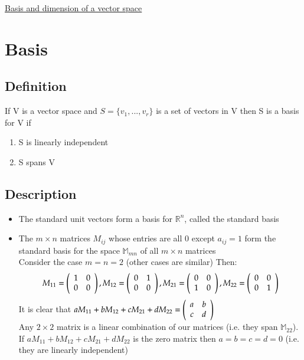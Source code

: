 \documentclass{article}[18pt]
\begin{document}
\begin{center}
\underline{\huge Basis and dimension of a vector space}
\end{center}
\section{Basis}
\subsection{Definition}
If V is a vector space and $S=\{v_1,...,v_r\}$ is a set of vectors in V then S is a basis for V if
\begin{enumerate}
	\item S is linearly independent
	\item S spans V
\end{enumerate}
\subsection{Description}
\begin{itemize}
	\item The standard unit vectors form a basis for $\mathbb{R}^n$, called the standard basis
	\item The $m\times n$ matrices $M_{ij}$ whose entries are all 0 except $a_{ij}=1$ form the standard basis for the space $\mathbb{M}_{mn}$ of all $m\times n$ matrices\\
	Consider the case $m=n=2$ (other cases are similar) Then:
	$$M _ { 11 } = \left( \begin{array} { c c } { 1 } & { 0 } \\ { 0 } & { 0 } \end{array} \right) , M _ { 12 } = \left( \begin{array} { c c } { 0 } & { 1 } \\ { 0 } & { 0 } \end{array} \right) , M _ { 21 } = \left( \begin{array} { c c } { 0 } & { 0 } \\ { 1 } & { 0 } \end{array} \right) , M _ { 22 } = \left( \begin{array} { c c } { 0 } & { 0 } \\ { 0 } & { 1 } \end{array} \right)$$
	It is clear that $a M _ { 11 } + b M _ { 12 } + c M _ { 21 } + d M _ { 22 } = \left( \begin{array} { c c } { a } & { b } \\ { c } & { d } \end{array} \right)$\\
	Any $2\times 2$ matrix is a linear combination of our matrices (i.e. they span $\mathbb{M}_{22}$). If $a M _ { 11 } + b M _ { 12 } + c M _ { 21 } + d M _ { 22 }$ is the zero matrix then $a=b=c=d=0$ (i.e. they are linearly independent)
\end{itemize}
\end{document}

